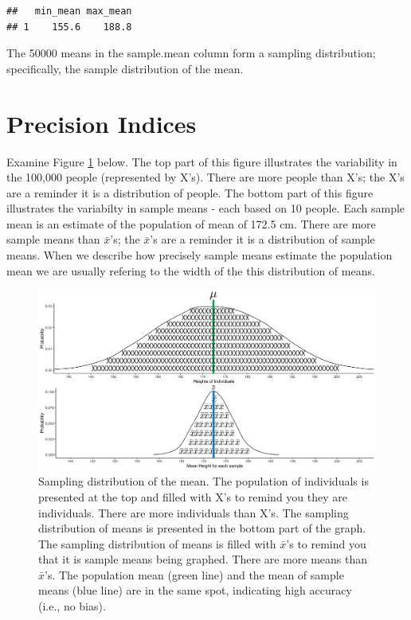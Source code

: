 \documentclass[
]{krantz}
\makeatletter
\newenvironment{Shaded}{\begin{snugshade}}{\end{snugshade}}
\newcommand{\DataTypeTok}[1]{\textcolor[rgb]{0.27,0.27,0.27}{#1}}
\newcommand{\KeywordTok}[1]{\textcolor[rgb]{0.27,0.27,0.27}{\textbf{#1}}}
\newcommand{\NormalTok}[1]{#1}
\newcommand{\OperatorTok}[1]{\textcolor[rgb]{0.43,0.43,0.43}{\textbf{#1}}}
\newcommand{\StringTok}[1]{\textcolor[rgb]{0.5,0.5,0.5}{#1}}
\newenvironment{kframe}{%
\medskip{}
\setlength{\fboxsep}{.8em}
 \def\at@end@of@kframe{}%
 \ifinner\ifhmode%
  \def\at@end@of@kframe{\end{minipage}}%
  \begin{minipage}{\columnwidth}%
 \fi\fi%
 \def\FrameCommand##1{\hskip\@totalleftmargin \hskip-\fboxsep
 \colorbox{shadecolor}{##1}\hskip-\fboxsep
     \hskip-\linewidth \hskip-\@totalleftmargin \hskip\columnwidth}%
 \MakeFramed {\advance\hsize-\width
   \@totalleftmargin\z@ \linewidth\hsize
   \@setminipage}}%
 {\par\unskip\endMakeFramed%
 \at@end@of@kframe}
\renewenvironment{Shaded}{\begin{kframe}}{\end{kframe}}
\makeatother
\begin{document}
\begin{Shaded}
\end{Shaded}

\begin{verbatim}
##   min_mean max_mean
## 1    155.6    188.8
\end{verbatim}

The 50000 means in the sample.mean column form a sampling distribution; specifically, the sample distribution of the mean.

\hypertarget{precision-indices}{%
\section{Precision Indices}\label{precision-indices}}

Examine Figure \ref{fig:bothdist2} below. The top part of this figure illustrates the variability in the 100,000 people (represented by X's). There are more people than X's; the X's are a reminder it is a distribution of people. The bottom part of this figure illustrates the variabilty in sample means - each based on 10 people. Each sample mean is an estimate of the population of mean of 172.5 cm. There are more sample means than \(\bar{x}\)'s; the \(\bar{x}\)'s are a reminder it is a distribution of sample means. When we describe how precisely sample means estimate the population mean we are usually refering to the width of the this distribution of means.

\begin{figure}
\includegraphics[width=0.8\linewidth]{ch_samples/images/sampling_dist} \caption[Sampling distribution of the mean.]{Sampling distribution of the mean. The population of individuals is presented at the top and filled with X's to remind you they are individuals. There are more individuals than X's. The sampling distribution of means is presented in the bottom part of the graph. The sampling distribution of means is filled with $\bar{x}$'s to remind you that it is sample means being graphed. There are more means than $\bar{x}$'s. The population mean (green line) and the mean of sample means (blue line) are in the same spot, indicating high accuracy (i.e., no bias).}\label{fig:bothdist2}
\end{figure}
\end{document}
